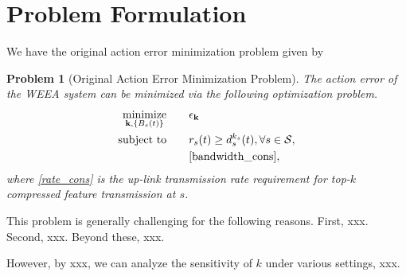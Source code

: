 \documentclass[lettersize,journal]{IEEEtran}
\theoremstyle{custom}
\newtheorem{Prob}{Problem}
\begin{document}
\section{Problem Formulation}
We have the original action error minimization problem given by
\begin{Prob}[Original Action Error Minimization Problem]
    The action error of the WEEA system can be minimized via the following optimization problem. 
    \begin{align}
        \underset{{\bf k}, \{B_s(t)\}}{\textrm{minimize}} \quad\quad & \epsilon_{\bf k} \nonumber\\
        \textrm{subject to} \quad\quad  & r_s(t) \geq d_s^{k_s}(t), \forall s \in \mathcal{S}, \label{rate_cons}\\
        & \eqref{bandwidth_cons}, \nonumber
    \end{align}
    where \eqref{rate_cons} is the up-link transmission rate requirement for top-$k$ compressed feature transmission at $s$. 
\end{Prob}

This problem is generally challenging for the following reasons. 
First, xxx. 
Second, xxx. 
Beyond these, xxx. 

However, by xxx, we can analyze the sensitivity of $k$ under various settings, xxx. 
\end{document}
